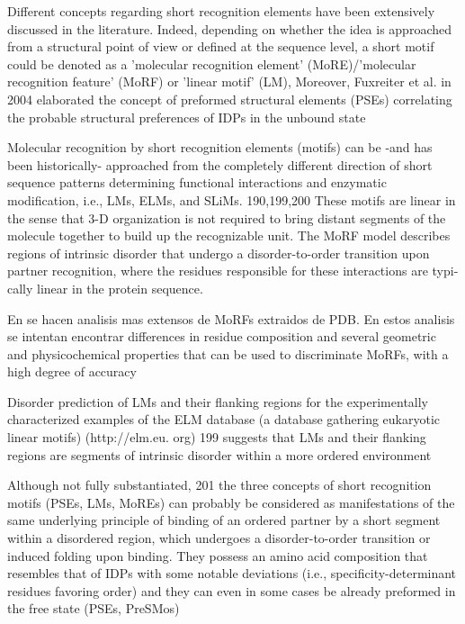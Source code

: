 Different concepts regarding short recognition elements have been extensively discussed in the literature. Indeed, depending on whether the idea is approached from a structural point of view
or defined at the sequence level, a short motif could be denoted as a 'molecular recognition element' (MoRE)/'molecular recognition feature' (MoRF) or 'linear motif' (LM),
Moreover, Fuxreiter et al. in 2004 elaborated the concept of
preformed structural elements (PSEs) correlating the probable
structural preferences of IDPs in the unbound state

Molecular recognition by short recognition elements (motifs)
can be -and has been historically- approached from the
completely different direction of short sequence patterns
determining functional interactions and enzymatic modification,
i.e., LMs, ELMs, and SLiMs. 190,199,200 These motifs are linear in
the sense that 3-D organization is not required to bring distant
segments of the molecule together to build up the recognizable
unit.
The MoRF model describes regions
of intrinsic disorder that undergo a disorder-to-order
transition upon partner recognition, where the
residues responsible for these interactions are typi-
cally linear in the protein sequence.

En \cite{mohan2006analysis,vacic2007characterization} se hacen analisis mas extensos de MoRFs extraidos de PDB.
En estos analisis se intentan encontrar differences in residue composition and several geometric and physicochemical properties that can be used to discriminate MoRFs, with a high degree of accuracy


Disorder prediction of LMs and their flanking regions for
the experimentally characterized examples of the ELM database
(a database gathering eukaryotic linear motifs) (http://elm.eu.
org) 199 suggests that LMs and their flanking regions are segments
of intrinsic disorder within a more ordered environment



Although not fully substantiated, 201 the three concepts of short
recognition motifs (PSEs, LMs, MoREs) can probably be
considered as manifestations of the same underlying principle of
binding of an ordered partner by a short segment within a
disordered region, which undergoes a disorder-to-order
transition or induced folding upon binding.
They possess an
amino acid composition that resembles that of IDPs with some
notable deviations (i.e., specificity-determinant residues favoring
order) and they can even in some cases be already preformed in
the free state (PSEs, PreSMos)

